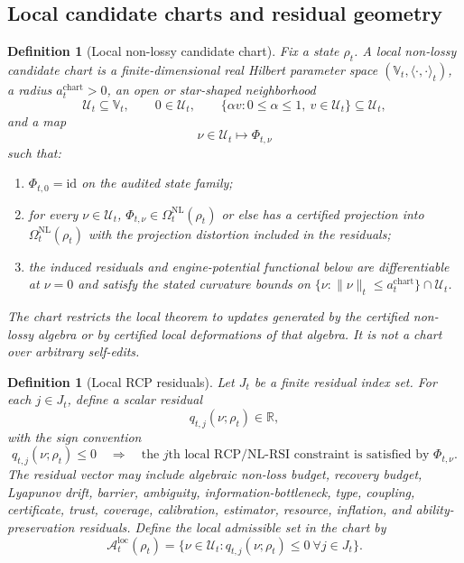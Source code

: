 \documentclass[11pt]{article}
\newtheorem{definition}[theorem]{Definition}
\newcommand{\id}{\mathrm{id}}
\newcommand{\1}{\mathbf{1}}
\begin{document}
\subsection{Local candidate charts and residual geometry}

\begin{definition}[Local non-lossy candidate chart]
\label{def:local_nl_candidate_chart}
Fix a state \(\rho_t\).  A local non-lossy candidate chart is a finite-dimensional real Hilbert parameter space \((\mathbb V_t,\langle\cdot,\cdot\rangle_t)\), a radius \(a_t^{\mathrm{chart}}>0\), an open or star-shaped neighborhood
\[
\mathcal U_t\subseteq\mathbb V_t,
\qquad
0\in\mathcal U_t,
\qquad
\{\alpha v:0\le\alpha\le1,\ v\in\mathcal U_t\}\subseteq\mathcal U_t,
\]
and a map
\[
\nu\in\mathcal U_t\longmapsto \Phi_{t,\nu}
\]
such that:
\begin{enumerate}[label=(\roman*),leftmargin=1.5em]
    \item \(\Phi_{t,0}=\id\) on the audited state family;
    \item for every \(\nu\in\mathcal U_t\), \(\Phi_{t,\nu}\in\Omega_t^{\mathrm{NL}}(\rho_t)\) or else has a certified projection into \(\Omega_t^{\mathrm{NL}}(\rho_t)\) with the projection distortion included in the residuals;
    \item the induced residuals and engine-potential functional below are differentiable at \(\nu=0\) and satisfy the stated curvature bounds on \(\{\nu:\|\nu\|_t\le a_t^{\mathrm{chart}}\}\cap\mathcal U_t\).
\end{enumerate}
The chart restricts the local theorem to updates generated by the certified non-lossy algebra or by certified local deformations of that algebra.  It is not a chart over arbitrary self-edits.
\end{definition}

\begin{definition}[Local RCP residuals]
\label{def:local_rcp_residuals_tangent}
Let \(J_t\) be a finite residual index set.  For each \(j\in J_t\), define a scalar residual
\[
q_{t,j}(\nu;\rho_t)\in\mathbb R,
\]
with the sign convention
\[
q_{t,j}(\nu;\rho_t)\le0
\quad\Longrightarrow\quad
\text{the }j\text{th local RCP/NL-RSI constraint is satisfied by }\Phi_{t,\nu}.
\]
The residual vector may include algebraic non-loss budget, recovery budget, Lyapunov drift, barrier, ambiguity, information-bottleneck, type, coupling, certificate, trust, coverage, calibration, estimator, resource, inflation, and ability-preservation residuals.  Define the local admissible set in the chart by
\[
\mathcal A_t^{\mathrm{loc}}(\rho_t)
=
\{\nu\in\mathcal U_t:q_{t,j}(\nu;\rho_t)\le0\ \forall j\in J_t\}.
\]
\end{definition}
\end{document}
